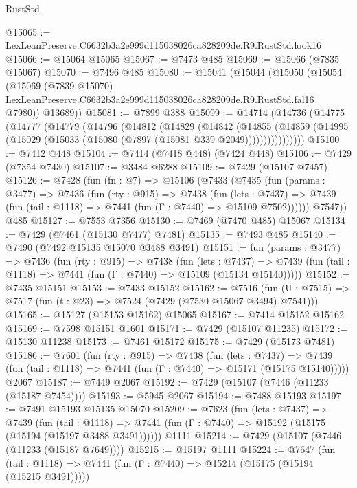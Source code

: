 \begin{lexlean}{RustStd}
\begin{coremodule}
@15065 := LexLeanPreserve.C6632b3a2e999d115038026ca828209de.R9.RustStd.look16
@15066 := @15064 @15065
@15067 := @7473 @485
@15069 := @15066 (@7835 @15067)
@15070 := @7496 @485
@15080 := @15041
    (@15044
      (@15050
        (@15054
          (@15069
            (@7839 @15070)
            LexLeanPreserve.C6632b3a2e999d115038026ca828209de.R9.RustStd.fal16
            @7980))
        @13689))
@15081 := @7899 @388
@15099 := @14714
    (@14736
      (@14775
        (@14777
          (@14779
            (@14796
              (@14812
                (@14829
                  (@14842
                    (@14855
                      (@14859
                        (@14995 (@15029 (@15033 (@15080 (@7897 (@15081 @339 @2049))))))))))))))))
@15100 := @7412 @448
@15104 := @7414 (@7418 @448) (@7424 @448)
@15106 := @7429 (@7354 @7430)
@15107 := @3484 @6288
@15109 := @7429 (@15107 @7457)
@15126 := @7428
    (fun (fn : @7) =>
    @15106
      (@7433
        (@7435
          (fun (params : @3477) =>
          @7436
            (fun (rty : @915) =>
            @7438
              (fun (lets : @7437) =>
              @7439 (fun (tail : @1118) => @7441 (fun (Γ : @7440) => @15109 @7502))))))
        @7547))
    @485
@15127 := @7553 @7356
@15130 := @7469 (@7470 @485) @15067
@15134 := @7429 (@7461 (@15130 @7477) @7481)
@15135 := @7493 @485
@15140 := @7490 (@7492 @15135 @15070 @3488 @3491)
@15151 := fun (params : @3477) =>
  @7436
    (fun (rty : @915) =>
    @7438
      (fun (lets : @7437) =>
      @7439 (fun (tail : @1118) => @7441 (fun (Γ : @7440) => @15109 (@15134 @15140)))))
@15152 := @7435 @15151
@15153 := @7433 @15152
@15162 := @7516
    (fun (U : @7515) => @7517 (fun (t : @23) => @7524 (@7429 (@7530 @15067 @3494) @7541)))
@15165 := @15127 (@15153 @15162) @15065
@15167 := @7414 @15152 @15162
@15169 := @7598 @15151 @1601
@15171 := @7429 (@15107 @11235)
@15172 := @15130 @11238
@15173 := @7461 @15172
@15175 := @7429 (@15173 @7481)
@15186 := @7601
    (fun (rty : @915) =>
    @7438
      (fun (lets : @7437) =>
      @7439 (fun (tail : @1118) => @7441 (fun (Γ : @7440) => @15171 (@15175 @15140)))))
    @2067
@15187 := @7449 @2067
@15192 := @7429 (@15107 (@7446 (@11233 (@15187 @7454))))
@15193 := @5945 @2067
@15194 := @7488 @15193
@15197 := @7491 @15193 @15135 @15070
@15209 := @7623
    (fun (lets : @7437) =>
    @7439
      (fun (tail : @1118) =>
      @7441 (fun (Γ : @7440) => @15192 (@15175 (@15194 (@15197 @3488 @3491))))))
    @1111
@15214 := @7429 (@15107 (@7446 (@11233 (@15187 @7649))))
@15215 := @15197 @1111
@15224 := @7647
    (fun (tail : @1118) => @7441 (fun (Γ : @7440) => @15214 (@15175 (@15194 (@15215 @3491)))))

\end{coremodule}
\end{lexlean}
